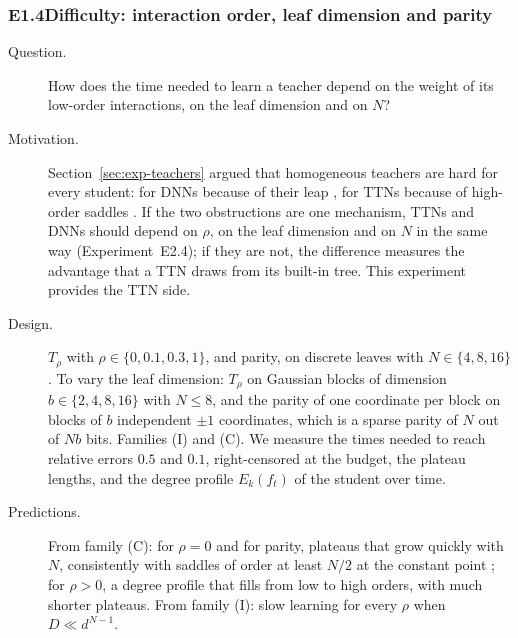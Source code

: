 \documentclass[11pt]{article}
\theoremstyle{definition}
\numberwithin{equation}{section}
\begin{document}
\subsubsection*{E1.4\quad Difficulty: interaction order, leaf dimension and parity}
\begin{description}
\item[Question.] How does the time needed to learn a teacher depend on the weight of its low-order interactions, on the leaf dimension and on $N$?
\item[Motivation.] Section~\ref{sec:exp-teachers} argued that homogeneous teachers are hard for every student: for DNNs because of their leap \citep{benarous2021online,abbe2023sgd}, for TTNs because of high-order saddles \citep{furman2026benign}. If the two obstructions are one mechanism, TTNs and DNNs should depend on $\rho$, on the leaf dimension and on $N$ in the same way (Experiment~E2.4); if they are not, the difference measures the advantage that a TTN draws from its built-in tree. This experiment provides the TTN side.
\item[Design.] $T_\rho$ with $\rho\in\{0,0.1,0.3,1\}$, and parity, on discrete leaves with $N\in\{4,8,16\}$. To vary the leaf dimension: $T_\rho$ on Gaussian blocks of dimension $b\in\{2,4,8,16\}$ with $N\le8$, and the parity of one coordinate per block on blocks of $b$ independent $\pm1$ coordinates, which is a sparse parity of $N$ out of $Nb$ bits. Families (I) and (C). We measure the times needed to reach relative errors $0.5$ and $0.1$, right-censored at the budget, the plateau lengths, and the degree profile $E_k(f_t)$ of the student over time.
\item[Predictions.] From family (C): for $\rho=0$ and for parity, plateaus that grow quickly with $N$, consistently with saddles of order at least $N/2$ at the constant point \citep[Proposition~5.3]{furman2026benign}; for $\rho>0$, a degree profile that fills from low to high orders, with much shorter plateaus. From family (I): slow learning for every $\rho$ when $D\ll d^{N-1}$.
\end{description}
\end{document}
